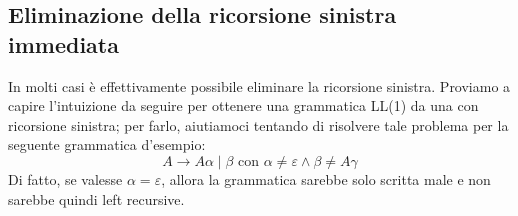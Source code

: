 \documentclass[class=book, crop=false, oneside, 12pt]{standalone}
\begin{document}
\subsection{Eliminazione della ricorsione sinistra immediata}
In molti casi è effettivamente possibile eliminare la ricorsione sinistra. 
Proviamo a capire l'intuizione da seguire per ottenere una grammatica LL(1) da una con ricorsione sinistra; per farlo, aiutiamoci tentando di risolvere tale problema per la seguente grammatica d'esempio:
\begin{equation}
    \label{left-recursive_grammar}
    A \to A \alpha \mid \beta \textrm{  con  } \alpha \neq \varepsilon \land \beta \neq A \gamma
\end{equation}
Di fatto, se valesse \(\alpha = \varepsilon\), allora la grammatica sarebbe solo scritta male e non sarebbe quindi left recursive.
\end{document}
